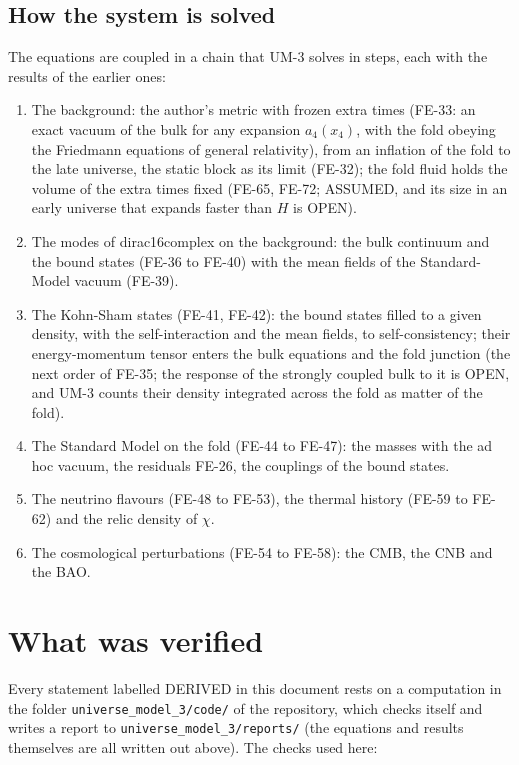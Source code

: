 \documentclass[
  10pt,
]{article}
\providecommand{\tightlist}{%
  \setlength{\itemsep}{0pt}\setlength{\parskip}{0pt}}
\begin{document}
\hypertarget{how-the-system-is-solved}{%
\subsection{How the system is solved}\label{how-the-system-is-solved}}

The equations are coupled in a chain that UM-3 solves in steps, each
with the results of the earlier ones:

\begin{enumerate}
\def\labelenumi{\arabic{enumi}.}
\tightlist
\item
  The background: the author's metric with frozen extra times (FE-33: an
  exact vacuum of the bulk for any expansion \(a_4(x_4)\), with the fold
  obeying the Friedmann equations of general relativity), from an
  inflation of the fold to the late universe, the static block as its
  limit (FE-32); the fold fluid holds the volume of the extra times
  fixed (FE-65, FE-72; ASSUMED, and its size in an early universe that
  expands faster than \(H\) is OPEN).
\item
  The modes of dirac16complex on the background: the bulk continuum and
  the bound states (FE-36 to FE-40) with the mean fields of the
  Standard-Model vacuum (FE-39).
\item
  The Kohn-Sham states (FE-41, FE-42): the bound states filled to a
  given density, with the self-interaction and the mean fields, to
  self-consistency; their energy-momentum tensor enters the bulk
  equations and the fold junction (the next order of FE-35; the response
  of the strongly coupled bulk to it is OPEN, and UM-3 counts their
  density integrated across the fold as matter of the fold).
\item
  The Standard Model on the fold (FE-44 to FE-47): the masses with the
  ad hoc vacuum, the residuals FE-26, the couplings of the bound states.
\item
  The neutrino flavours (FE-48 to FE-53), the thermal history (FE-59 to
  FE-62) and the relic density of \(\chi\).
\item
  The cosmological perturbations (FE-54 to FE-58): the CMB, the CNB and
  the BAO.
\end{enumerate}

\hypertarget{what-was-verified}{%
\section{What was verified}\label{what-was-verified}}

Every statement labelled DERIVED in this document rests on a computation
in the folder \texttt{universe\_model\_3/code/} of the repository, which
checks itself and writes a report to
\texttt{universe\_model\_3/reports/} (the equations and results
themselves are all written out above). The checks used here:
\end{document}
